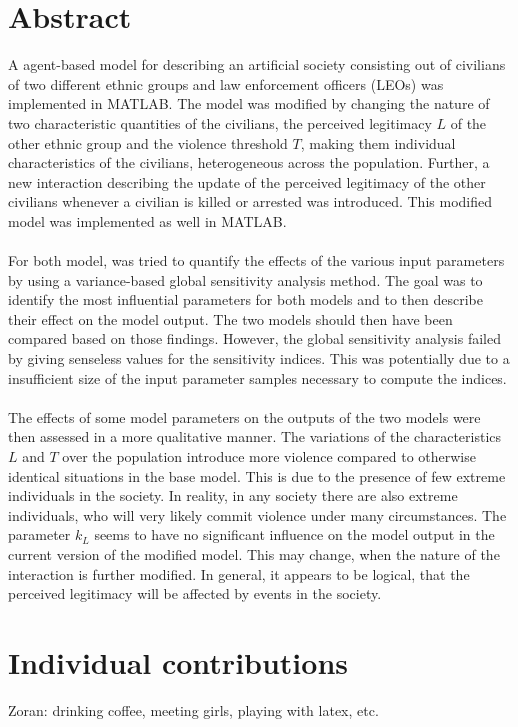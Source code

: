 \documentclass[11pt]{article}
\begin{document}
\section{Abstract}
A agent-based model for describing an artificial society consisting out of civilians of two different ethnic groups and law enforcement officers (LEOs) was implemented in MATLAB. The model was modified by changing the nature of two characteristic quantities of the civilians, the perceived legitimacy $L$ of the other ethnic group and the violence threshold $T$, making them individual characteristics of the civilians, heterogeneous across the population. Further, a new interaction describing the update of the perceived legitimacy of the other civilians whenever a civilian is killed or arrested was introduced. This modified model was implemented as well in MATLAB.\\
\\
For both model, was tried to quantify the effects of the various input parameters by using a variance-based global sensitivity analysis method. The goal was to identify the most influential parameters for both models and to then describe their effect on the model output. The two models should then have been compared based on those findings. However, the global sensitivity analysis failed by giving senseless values for the sensitivity indices. This was potentially due to a insufficient size of the input parameter samples necessary to compute the indices.\\
\\
The effects of some model parameters on the outputs of the two models were then assessed in a more qualitative manner. The variations of the characteristics $L$ and $T$ over the population introduce more violence compared to otherwise identical situations in the base model. This is due to the presence of few extreme individuals in the society. In reality, in any society there are also extreme individuals, who will very likely commit violence under many circumstances. The parameter $k_L$ seems to have no significant influence on the model output in the current version of the modified model. This may change, when the nature of the interaction is further modified. In general, it appears to be logical, that the perceived legitimacy will be affected by events in the society.

\section{Individual contributions}
Zoran: drinking coffee, meeting girls, playing with latex, etc.
\end{document}
